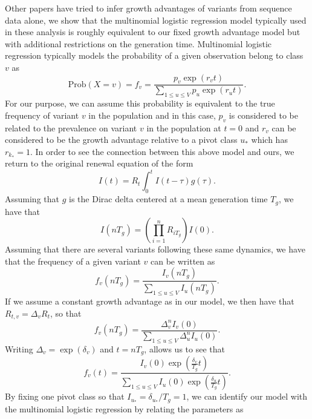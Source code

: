 \documentclass[12pt]{article}
\begin{document}
Other papers have tried to infer growth advantages of variants from sequence data alone, we show that the multinomial logistic regression model typically used in these analysis is roughly equivalent to our fixed growth advantage model but with additional restrictions on the generation time.
Multinomial logistic regression typically models the probability of a given observation belong to class $v$ as
\begin{equation}
  \text{Prob}(X = v) = f_{v} = \frac{p_{v}\exp(r_{v} t)}{\sum_{1\leq u\leq V} p_{u}\exp(r_{u} t)}.
\end{equation}
For our purpose, we can assume this probability is equivalent to the true frequency of variant $v$ in the population and in this case, $p_{v}$ is considered to be related to the prevalence on variant $v$ in the population at $t=0$ and $r_{v}$ can be considered to be the growth advantage relative to a pivot class $u_{*}$ which has $r_{k_{*}} = 1$.
In order to see the connection between this above model and ours, we return to the original renewal equation of the form
\begin{equation}
  I(t) = R_{t}\int_{0}^{t} I(t-\tau) g(\tau).
\end{equation}
Assuming that $g$  is the Dirac delta centered at a mean generation time $T_{g}$, we have that
\begin{equation}
  I(nT_{g}) = \left(\prod_{i=1}^{n} R_{iT_{g}}\right) I(0).
\end{equation}
Assuming that there are several variants following these same dynamics, we have that the frequency of a given variant $v$ can be written as
\begin{equation}
  f_{v}(nT_{g}) = \frac{I_{v}(nT_{g})}{\sum_{1\leq u \leq V} I_{u}(nT_{g})}.
\end{equation}
If we assume a constant growth advantage as in our model, we then have that $R_{t,v} = \Delta_{v} R_{t}$, so that
\begin{equation}
  f_{v}(nT_{g}) =  \frac{\Delta_{v}^{n} I_{v}(0)}{\sum_{1\leq u \leq V} \Delta_{u}^{n} I_{u}(0)}.
\end{equation}
Writing $\Delta_{v} = \exp(\delta_{v})$ and $t = n T_{g}$, allows us to see that
\begin{equation}
  f_{v}(t) = \frac{I_{v}(0) \exp(\frac{\delta_{v}}{T_{g}} t)}{\sum_{1\leq u \leq V}I_{u}(0) \exp(\frac{\delta_{u}}{T_{g}} t)}.
\end{equation}
By fixing one pivot class so that $I_{u_{*}} = \delta_{u_{*}} / T_{g} = 1$, we can identify our model with the multinomial logistic regression by relating the parameters as
\end{document}
